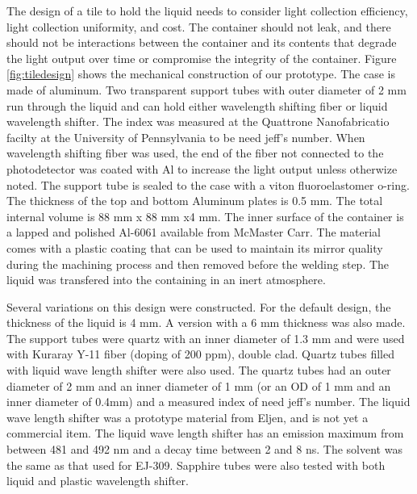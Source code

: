 \documentclass[review]{elsarticle}
\begin{document}
The design of a tile to hold the liquid needs to consider light collection efficiency, light collection uniformity, and cost.  The container should not leak, and there should not be interactions between the container and its contents that degrade the light output over time or compromise the integrity
of the container.
Figure \ref{fig:tiledesign} shows the mechanical construction of our prototype.  The case is made of aluminum.  Two transparent support tubes with outer diameter of 2 mm run through the liquid and can hold either wavelength shifting fiber or liquid wavelength shifter.  The index was measured at the Quattrone Nanofabricatio facilty at the University of Pennsylvania to be {\color{red} need jeff's number}.
When wavelength shifting fiber was used, the end of the fiber not connected to the photodetector was coated with Al to increase the light output unless otherwize noted.
The support tube is sealed to the case with a viton fluoroelastomer o-ring.  The thickness of the top and bottom Aluminum plates is 0.5 mm.  The total internal volume is 88 mm x 88 mm x4 mm. The inner surface of the container
is a lapped and polished Al-6061 available from McMaster Carr. The material comes with a plastic coating that can be 
used to maintain its mirror quality during the machining process and then removed before the welding step.  The liquid was transfered into the containing in an inert atmosphere.

Several variations on this design were constructed.  For the default design, the thickness of the liquid is 4 mm.  A version with a 6 mm thickness was also made.  The support tubes were quartz with an inner diameter of 1.3 mm and were used with Kuraray Y-11 fiber (doping of 200 ppm), double clad.  Quartz tubes filled with liquid wave length shifter were also used.  The quartz tubes had
an outer diameter of 2 mm and an inner diameter of 1 mm (or an OD of 1 mm and an inner diameter of 0.4mm)  and a measured index of {\color{red} need jeff's number}.  The liquid wave length shifter was a prototype material from Eljen, and is not yet a commercial item.
The liquid wave length shifter has an emission maximum from between 
481 and 492 nm and a decay time between 2 and 8 ns.  
The solvent was the same as that used for EJ-309.
Sapphire tubes were also tested with both liquid and plastic wavelength shifter.
\end{document}
